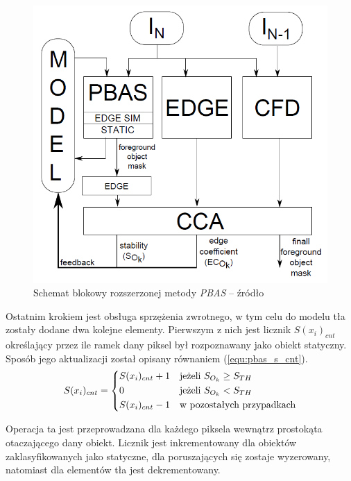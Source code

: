  
	\begin{figure}[h]
		\centering
		\includegraphics[scale=0.6]{img/3/pbas_diagram.png}
		\caption{Schemat blokowy rozszerzonej metody \textit{PBAS} -- źródło \cite{kryjak_14_pbas}}
		\label{fig:pbas_diagram}
	\end{figure}


Ostatnim krokiem jest obsługa sprzężenia zwrotnego, w tym celu do modelu tła zostały dodane dwa kolejne elementy. Pierwszym z nich jest licznik $S(x_i)_{cnt}$ określający przez ile ramek dany piksel był rozpoznawany jako obiekt statyczny. Sposób jego aktualizacji został opisany równaniem (\ref{equ:pbas_s_cnt}). 
    \begin{equation}
	    S(x_i)_{cnt} = 
		\begin{dcases}
    		S(x_i)_{cnt} + 1 & \text{jeżeli } S_{O_k} \geq  S_{TH}	 \\
            0                & \text{jeżeli } S_{O_k} <  S_{TH}	     \\		
    		S(x_i)_{cnt} - 1 & \text{w pozostałych przypadkach} 
		\end{dcases}
	\label{equ:pbas_s_cnt}	
	\end{equation}

\noindent Operacja ta jest przeprowadzana dla każdego piksela wewnątrz prostokąta otaczającego dany obiekt. Licznik jest inkrementowany dla obiektów zaklasyfikowanych jako statyczne, dla poruszających się zostaje wyzerowany, natomiast dla elementów tła jest dekrementowany.

